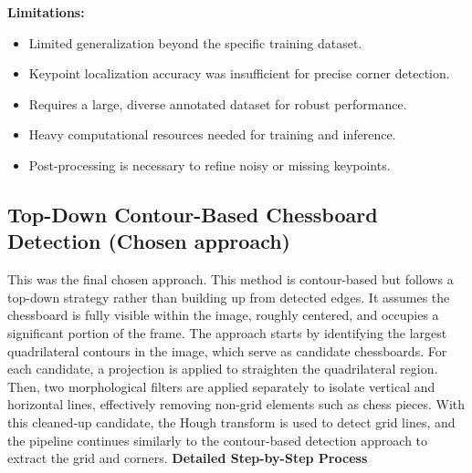 \noindent
\textbf{Limitations:}
\begin{itemize}
  \item Limited generalization beyond the specific training dataset.
  \item Keypoint localization accuracy was insufficient for precise corner detection.
  \item Requires a large, diverse annotated dataset for robust performance.
  \item Heavy computational resources needed for training and inference.
  \item Post-processing is necessary to refine noisy or missing keypoints.
\end{itemize}

\subsection{Top-Down Contour-Based Chessboard Detection (Chosen approach)}
This was the final chosen approach. This method is contour-based but follows a top-down strategy rather than building up from detected edges. 
It assumes the chessboard is fully visible within the image, roughly centered, and occupies a significant portion of the frame. 
The approach starts by identifying the largest quadrilateral contours in the image, which serve as candidate chessboards.
\newline
For each candidate, a projection is applied to straighten the quadrilateral region. 
Then, two morphological filters are applied separately to isolate vertical and horizontal lines, effectively removing non-grid elements such as chess pieces. 
With this cleaned-up candidate, the Hough transform is used to detect grid lines, and the pipeline continues similarly to the contour-based detection approach to extract the grid and corners.
\newline
\textbf{Detailed Step-by-Step Process}
